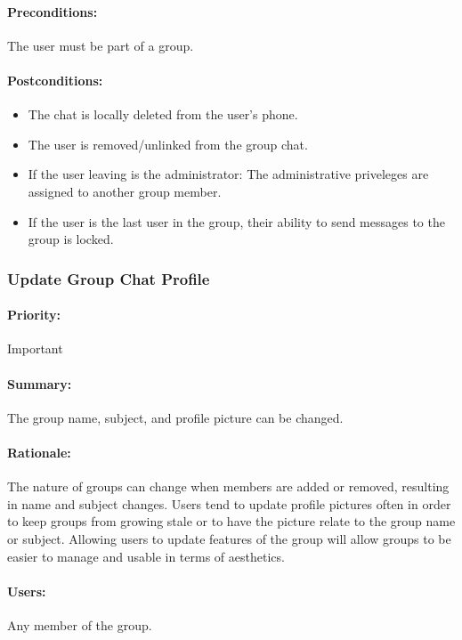 \documentclass[11pt]{article}
\begin{document}
\paragraph{Preconditions:} The user must be part of a group.
\paragraph{{Postconditions:}} 
\begin{itemize}
	\item The chat is locally deleted from the user's phone.
	\item The user is removed/unlinked from the group chat.
	\item If the user leaving is the administrator: The administrative priveleges are assigned to another group member.
	\item If the user is the last user in the group, their ability to send messages to the group is locked.
\end{itemize}

\subsubsection{Update Group Chat Profile} \label{UC-update-group}
\paragraph{Priority:} Important
\paragraph{Summary:}
The group name, subject, and profile picture can be changed.
\paragraph{Rationale:}
The nature of groups can change when members are added or removed, resulting in name and subject changes. Users tend to update profile pictures often in order to keep groups from growing stale or to have the picture relate to the group name or subject. Allowing users to update features of the group will allow groups to be easier to manage and usable in terms of aesthetics.
\paragraph{Users:}
Any member of the group.
\end{document}
